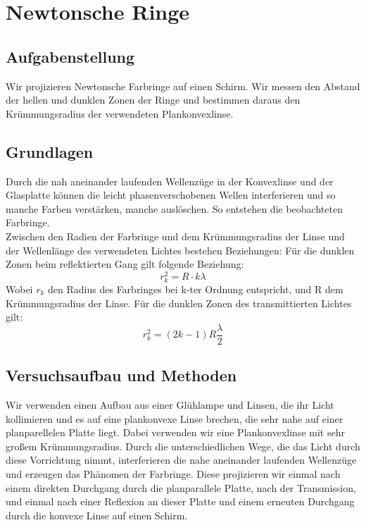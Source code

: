 \documentclass{article}
\begin{document}
\section{Newtonsche Ringe}

\subsection{Aufgabenstellung}
Wir projizieren Newtonsche Farbringe auf einen Schirm. Wir messen den Abstand der hellen und dunklen Zonen der Ringe und bestimmen daraus den Krümmungsradius der verwendeten Plankonvexlinse.
\subsection{Grundlagen}
Durch die nah aneinander laufenden Wellenzüge in der Konvexlinse und der Glasplatte können die leicht phasenverschobenen Wellen interferieren und so manche Farben verstärken, manche auslöschen. So entstehen die beobachteten Farbringe. \\
Zwischen den Radien der Farbringe und dem Krümmungsradius der Linse und der Wellenlänge des verwendeten Lichtes bestehen Beziehungen:
Für die dunklen Zonen beim reflektierten Gang gilt folgende Beziehung:
\begin{equation}
\label{reflexionradius}
r_k^2=R\cdot k\lambda
\end{equation}
Wobei $r_k$ den Radius des Farbringes bei k-ter Ordnung entspricht, und R dem Krümmungsradius der Linse.
Für die dunklen Zonen des transmittierten Lichtes gilt:
\begin{equation}
\label{transradius}
r_k^2=(2k-1)R\frac{\lambda}{2}
\end{equation}
\subsection{Versuchsaufbau und Methoden} Wir verwenden einen Aufbau aus einer Glühlampe und Linsen, die ihr Licht kollimieren und es auf eine plankonvexe Linse brechen, die sehr nahe auf einer planparellelen Platte liegt. Dabei verwenden wir eine Plankonvexlinse mit sehr großem Krümmungsradius. Durch die unterschiedlichen Wege, die das Licht durch diese Vorrichtung nimmt, interferieren die nahe aneinander laufenden Wellenzüge und erzeugen das Phänomen der Farbringe. Diese projizieren wir einmal nach einem direkten Durchgang durch die planparallele Platte, nach der Transmission, und einmal nach einer Reflexion an dieser Platte und einem erneuten Durchgang durch die konvexe Linse auf einen Schirm. 
\end{document}
